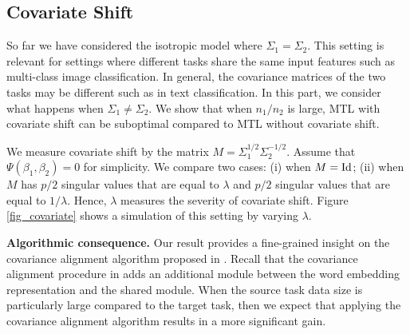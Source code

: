 \subsection{Covariate Shift}

So far we have considered the isotropic model where $\Sigma_1 = \Sigma_2$.
This setting is relevant for settings where different tasks share the same input features such as multi-class image classification.
In general, the covariance matrices of the two tasks may be different such as in text classification.
In this part, we consider what happens when $\Sigma_1 \neq \Sigma_2$.
We show that when $n_1 / n_2$ is large, MTL with covariate shift can be suboptimal compared to MTL without covariate shift.

\begin{example}\label{ex_complement}
	We measure covariate shift by the matrix $M = \Sigma_1^{1/2} \Sigma_2^{-1/2}$.
	Assume that $\Psi(\beta_1, \beta_2) = 0$ for simplicity.
	We compare two cases: (i) when $M = \operatorname{Id}$; (ii) when $M$ has $p/2$ singular values that are equal to $\lambda$ and $p/2$ singular values that are equal to $1 / \lambda$.
	Hence, $\lambda$ measures the severity of covariate shift.
	Figure \ref{fig_covariate} shows a simulation of this setting by varying $\lambda$.
\end{example}



\textbf{Algorithmic consequence.}
Our result provides a fine-grained insight on the covariance alignment algorithm proposed in \cite{WZR20}.
Recall that the covariance alignment procedure in \cite{WZR20} adds an additional module between the word embedding representation and the shared module.
When the source task data size is particularly large compared to the target task, then we expect that applying the covariance alignment algorithm results in a more significant gain.